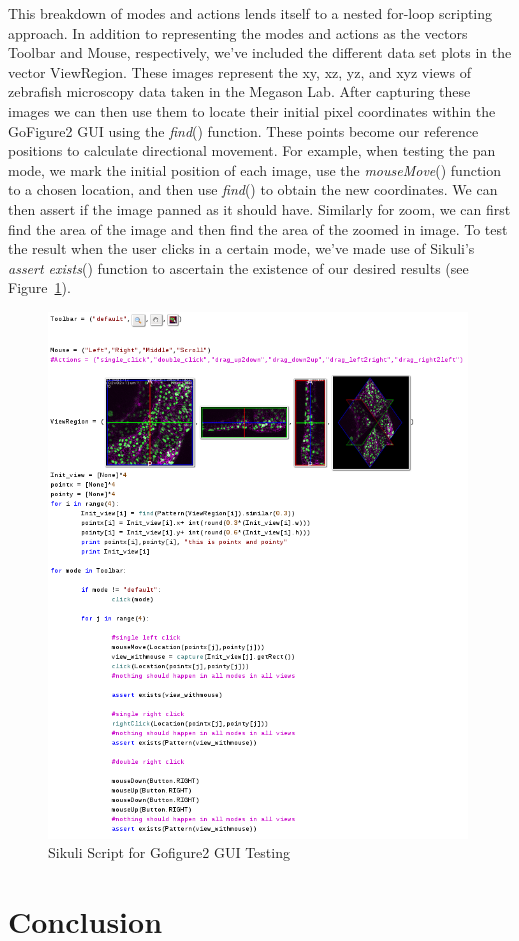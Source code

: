 \documentclass{InsightArticle}
\begin{document}
This breakdown of modes and actions lends itself to a nested for-loop scripting approach. In addition to representing the modes and actions
as the vectors Toolbar and Mouse, respectively, we've included the different data set plots in the vector ViewRegion.
These images represent the xy, xz, yz, and xyz views of zebrafish microscopy data taken in the Megason Lab.  After capturing
these images we can then use them to locate their initial pixel coordinates within the GoFigure2 GUI using the \emph{find}() function.  These points become 
our reference positions to calculate directional movement.  For example, when testing the pan mode, we mark the initial position of each image,
use the \emph{mouseMove}() function to a chosen location, and then use \emph{find}() to obtain the new coordinates.  We can then assert if the image panned as it should have.
Similarly for zoom, we can first find the area of the image and then find the area of the zoomed in image.  To test the result when the user clicks 
in a certain mode, we've made use of Sikuli's \emph{assert exists}() function to ascertain the existence of our
desired results   (see Figure~\ref{fig:Gofigure2Example}).

\begin{figure}[htp]
 \centering
 \includegraphics[width=0.99\textwidth]{Images/Gofigure2Example.png}
 \caption{Sikuli Script for Gofigure2 GUI Testing}
 \label{fig:Gofigure2Example}
\end{figure}
\section{Conclusion}

\clearpage



\end{document}
